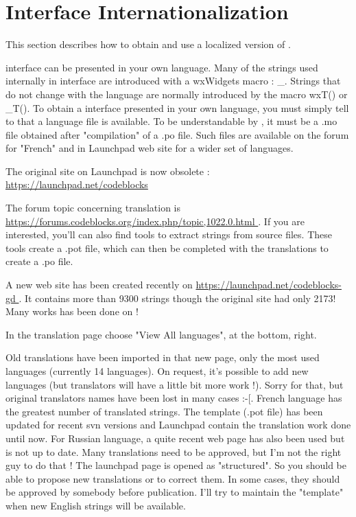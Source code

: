 \section{\codeblocks Interface Internationalization}\label{sec:cb_Internationalization}

This section describes how to obtain and use a localized version of \codeblocks.

\codeblocks interface can be presented in your own language. Many of the strings used internally in \codeblocks interface are introduced with a wxWidgets macro : \_. Strings that do not change with the language are normally introduced by the macro wxT() or \_T(). To obtain a \codeblocks interface presented in your own language, you must simply tell to \codeblocks that a language file is available. To be understandable by \codeblocks, it must be a .mo file obtained after "compilation" of a .po file. Such files are available on the forum for "French" and in Launchpad web site for a wider set of languages.

\begin{description}
\item The original site on Launchpad is now obsolete : \url{https://launchpad.net/codeblocks }
\item The forum topic concerning translation is \url{https://forums.codeblocks.org/index.php/topic,1022.0.html }. If you are interested, you'll can also find tools to extract strings from \codeblocks source files. These tools create a .pot file, which can then be completed with the translations to create a .po file. 
\item A new web site has been created recently on \url{https://launchpad.net/codeblocks-gd }. It contains more than 9300 strings though the original site had only 2173! Many works has been done on \codeblocks !
\end{description}

In the translation page choose "View All languages", at the bottom, right.

Old translations have been imported in that new page, only the most used languages (currently 14 languages). On request, it's possible to add new languages (but translators will have a little bit more work !).\newline
Sorry for that, but original translators names have been lost in many cases  :-[.\newline
French language has the greatest number of translated strings. The template (.pot file) has been updated for recent svn versions and Launchpad contain the translation work done until now. For Russian language, a quite recent web page has also been used but is not up to date. Many translations need to be approved, but I'm not the right guy to do that !\newline
The launchpad page is opened as "structured". So you should be able to propose new translations or to correct them. In some cases, they should be approved by somebody before publication.\newline
I'll try to maintain the "template" when new English strings will be available.

